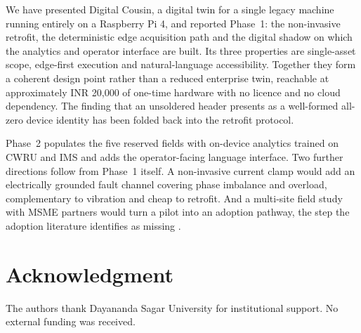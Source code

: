 \documentclass[conference]{IEEEtran}
\begin{document}
We have presented Digital Cousin, a digital twin for a single legacy machine
running entirely on a Raspberry Pi 4, and reported Phase~1: the non-invasive
retrofit, the deterministic edge acquisition path and the digital shadow on
which the analytics and operator interface are built. Its three properties are
single-asset scope, edge-first execution and natural-language accessibility.
Together they form a coherent design point rather than a reduced enterprise
twin, reachable at approximately INR 20,000 of one-time hardware with no
licence and no cloud dependency. The finding that an unsoldered
header presents as a well-formed all-zero device identity has been folded
back into the retrofit protocol.

Phase~2 populates the five reserved fields with on-device analytics trained
on CWRU \cite{b7} and IMS \cite{b8} and adds the operator-facing language
interface. Two further directions follow from Phase~1 itself. A non-invasive
current clamp would add an electrically grounded fault channel covering
phase imbalance and overload, complementary to vibration and cheap to
retrofit. And a multi-site field study with MSME partners would turn a pilot
into an adoption pathway, the step the adoption literature identifies as
missing \cite{b33,b34,b35}.

\section*{Acknowledgment}

The authors thank Dayananda Sagar University for institutional support. No
external funding was received.
\end{document}
